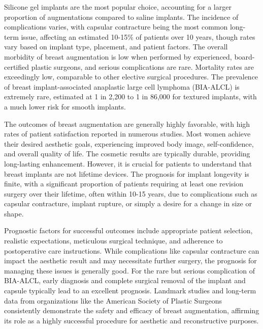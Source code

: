 Silicone gel implants are the most popular choice, accounting for a larger proportion of augmentations compared to saline implants. The incidence of complications varies, with capsular contracture being the most common long-term issue, affecting an estimated 10-15\% of patients over 10 years, though rates vary based on implant type, placement, and patient factors. The overall morbidity of breast augmentation is low when performed by experienced, board-certified plastic surgeons, and serious complications are rare. Mortality rates are exceedingly low, comparable to other elective surgical procedures. The prevalence of breast implant-associated anaplastic large cell lymphoma (BIA-ALCL) is extremely rare, estimated at 1 in 2,200 to 1 in 86,000 for textured implants, with a much lower risk for smooth implants.

The outcomes of breast augmentation are generally highly favorable, with high rates of patient satisfaction reported in numerous studies. Most women achieve their desired aesthetic goals, experiencing improved body image, self-confidence, and overall quality of life. The cosmetic results are typically durable, providing long-lasting enhancement. However, it is crucial for patients to understand that breast implants are not lifetime devices. The prognosis for implant longevity is finite, with a significant proportion of patients requiring at least one revision surgery over their lifetime, often within 10-15 years, due to complications such as capsular contracture, implant rupture, or simply a desire for a change in size or shape.

Prognostic factors for successful outcomes include appropriate patient selection, realistic expectations, meticulous surgical technique, and adherence to postoperative care instructions. While complications like capsular contracture can impact the aesthetic result and may necessitate further surgery, the prognosis for managing these issues is generally good. For the rare but serious complication of BIA-ALCL, early diagnosis and complete surgical removal of the implant and capsule typically lead to an excellent prognosis. Landmark studies and long-term data from organizations like the American Society of Plastic Surgeons consistently demonstrate the safety and efficacy of breast augmentation, affirming its role as a highly successful procedure for aesthetic and reconstructive purposes.

